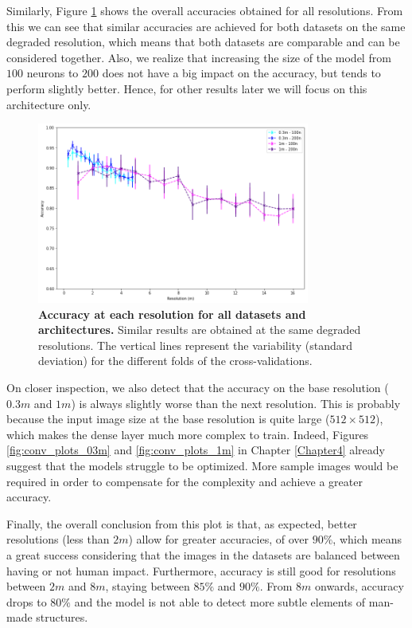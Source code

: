 Similarly, Figure \ref{fig:acc_res_03m_1m} shows the overall accuracies obtained for all resolutions. From this we can see that similar accuracies are achieved for both datasets on the same degraded resolution, which means that both datasets are comparable and can be considered together. Also, we realize that increasing the size of the model from $100$ neurons to $200$ does not have a big impact on the accuracy, but tends to perform slightly better. Hence, for other results later we will focus on this architecture only.

\begin{figure}[h!]
	\centering
	\includegraphics[width=0.8\textwidth]{Figures/results/acc_res_03m_1m.png}
	\captionsetup{width=1\linewidth}
	\caption{\textbf{Accuracy at each resolution for all datasets and architectures.} Similar results are obtained at the same degraded resolutions. The vertical lines represent the variability (standard deviation) for the different folds of the cross-validations.}
	\label{fig:acc_res_03m_1m}
\end{figure}

On closer inspection, we also detect that the accuracy on the base resolution ($0.3m$ and $1m$) is always slightly worse than the next resolution. This is probably because the input image size at the base resolution is quite large ($512\times512$), which makes the dense layer much more complex to train. Indeed, Figures \ref{fig:conv_plots_03m} and \ref{fig:conv_plots_1m} in Chapter \ref{Chapter4} already suggest that the models struggle to be optimized. More sample images would be required in order to compensate for the complexity and achieve a greater accuracy. 

Finally, the overall conclusion from this plot is that, as expected, better resolutions (less than $2m$) allow for greater accuracies, of over $90\%$, which means a great success considering that the images in the datasets are balanced between having or not human impact. Furthermore, accuracy is still good for resolutions between $2m$ and $8m$, staying between $85\%$ and $90\%$. From $8m$ onwards, accuracy drops to $80\%$ and the model is not able to detect more subtle elements of man-made structures.

